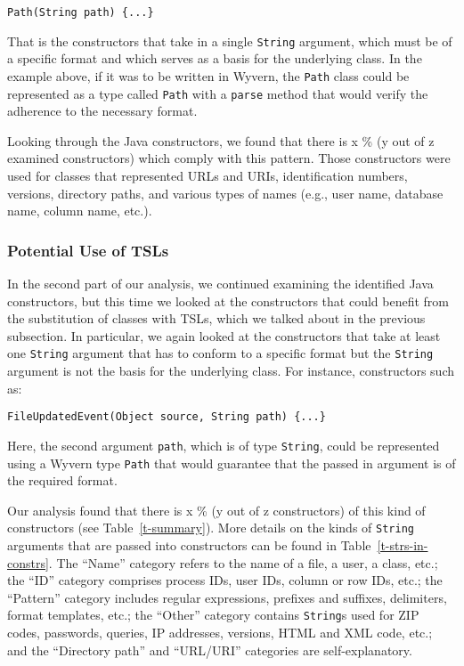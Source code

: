 \begin{lstlisting}
Path(String path) {...}
\end{lstlisting}

That is the constructors that take in a single \lstinline{String} argument, which must be of a specific format and which serves as a basis for the underlying class. In the example above, if it was to be written in Wyvern, the \lstinline{Path} class could be represented as a type called \lstinline{Path} with a \lstinline{parse} method that would verify the adherence to the necessary format.

Looking through the Java constructors, we found that there is x \% (y out of z examined constructors) which comply with this pattern. Those constructors were used for classes that represented URLs and URIs, identification numbers, versions, directory paths, and various types of names (e.g., user name, database name, column name, etc.).

\subsubsection{Potential Use of TSLs}

In the second part of our analysis, we continued examining the identified Java constructors, but this time we looked at the constructors that could benefit from the substitution of classes with TSLs, which we talked about in the previous subsection. In particular, we again looked at the constructors that take at least one \lstinline{String} argument that has to conform to a specific format but the \lstinline{String} argument is not the basis for the underlying class. For instance, constructors such as:

\begin{lstlisting}
FileUpdatedEvent(Object source, String path) {...}
\end{lstlisting}

Here, the second argument \lstinline{path}, which is of type \lstinline{String}, could be represented using a Wyvern type \lstinline{Path} that would guarantee that the passed in argument is of the required format.

Our analysis found that there is x \% (y out of z constructors) of this kind of constructors (see Table~\ref{t-summary}). More details on the kinds of \lstinline{String} arguments that are passed into constructors can be found in Table~\ref{t-strs-in-constrs}. The ``Name'' category refers to the name of a file, a user, a class, etc.; the ``ID'' category comprises process IDs, user IDs, column or row IDs, etc.; the ``Pattern'' category includes regular expressions, prefixes and suffixes, delimiters, format templates, etc.; the ``Other'' category contains \lstinline{String}s used for ZIP codes, passwords, queries, IP addresses, versions, HTML and XML code, etc.; and the ``Directory path'' and ``URL/URI'' categories are self-explanatory.

